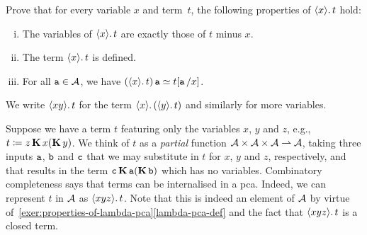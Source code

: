 \begin{exercise}\label{exer:properties-of-lambda-pca}
  Prove that for every variable \(x\) and term~\(t\), the following properties
  of \(\lambdapca{x}{t}\) hold:
  \begin{enumerate}[(i)]
  \item The variables of \(\lambdapca{x}{t}\) are exactly those of \(t\) minus
    \(x\).
  \item\label{lambda-pca-def} The term \(\lambdapca{x}{t}\) is defined.
  \item For all \(\pca{a} \in \AA\), we have
    \((\lambdapca{x}{t})\pca{a} \simeq t[\pca{a}/x]\).
  \end{enumerate}
\end{exercise}

\begin{notation}
  We write \(\lambdapca{xy}{t}\) for the term
  \(\lambdapca{x}({\lambdapca{y}{t}})\) and similarly for more variables.
\end{notation}

Suppose we have a term \(t\) featuring only the variables \(x\), \(y\) and
\(z\), e.g., \(t \coloneqq z\kcomb x(\kcomb y)\).
%
We think of \(t\) as a \emph{partial} function
\(\AA \times \AA \times \AA \pto \AA\), taking three inputs \(\pca{a}\),
\(\pca{b}\) and \(\pca{c}\) that we may substitute in \(t\) for \(x\), \(y\) and
\(z\), respectively, and that results in the term
\(\pca{c}\kcomb\pca{a}(\kcomb\pca{b})\) which has no variables.
%
Combinatory completeness says that terms can be internalised in a pca. Indeed,
we can represent \(t\) in \(\AA\) as \(\lambdapca{xyz}{t}\). Note that this is
indeed an element of \(\AA\) by virtue
of~\cref{exer:properties-of-lambda-pca}\ref{lambda-pca-def} and the fact that
\(\lambdapca{xyz}{t}\) is a closed term.


